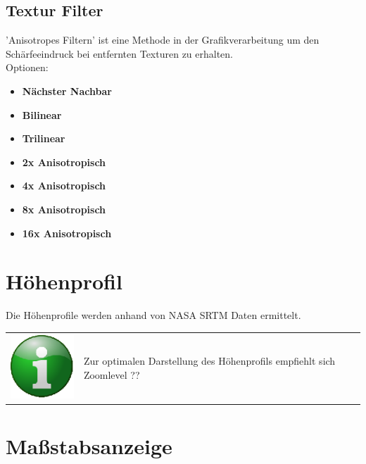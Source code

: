 \documentclass[10pt]{scrreprt}
\begin{document}
\vspace{3mm}
\subsection{Textur Filter}  


'Anisotropes Filtern'  ist eine Methode in der Grafikverarbeitung um den Schärfeeindruck bei entfernten Texturen zu erhalten.\\

Optionen:
\begin{itemize}
\item \textbf{Nächster Nachbar}
\item \textbf{Bilinear}
\item \textbf{Trilinear}
\item \textbf{2x Anisotropisch}
\item \textbf{4x Anisotropisch}
\item \textbf{8x Anisotropisch}
\item \textbf{16x Anisotropisch}
\end{itemize}





\vspace{3mm}
\section{Höhenprofil} 
Die Höhenprofile werden anhand von NASA  SRTM  Daten ermittelt.

\vspace{3mm}
\begin{tabular}{>{\centering \arraybackslash}m{1cm} m{14cm}}
\includegraphics[scale=0.5]{images/info.eps} &  Zur optimalen Darstellung des Höhenprofils empfiehlt sich Zoomlevel ?? \\ 
\end{tabular} 



\vspace{3mm}
\section{Maßstabsanzeige} 
\end{document}
